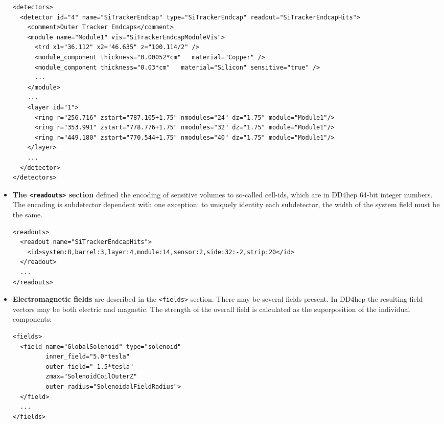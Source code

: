 \begin{itemize}
\begin{verbatim}
<detectors>
  <detector id="4" name="SiTrackerEndcap" type="SiTrackerEndcap" readout="SiTrackerEndcapHits">
    <comment>Outer Tracker Endcaps</comment>
    <module name="Module1" vis="SiTrackerEndcapModuleVis">
      <trd x1="36.112" x2="46.635" z="100.114/2" />
      <module_component thickness="0.00052*cm"   material="Copper" />
      <module_component thickness="0.03*cm"   material="Silicon" sensitive="true" />
      ...
    </module> 
    ...
    <layer id="1">
      <ring r="256.716" zstart="787.105+1.75" nmodules="24" dz="1.75" module="Module1"/>
      <ring r="353.991" zstart="778.776+1.75" nmodules="32" dz="1.75" module="Module1"/>
      <ring r="449.180" zstart="770.544+1.75" nmodules="40" dz="1.75" module="Module1"/>
    </layer>
    ...
  </detector>
</detectors>
\end{verbatim}

\item {\textbf{The \texttt{<readouts>} section}} defined the encoding of sensitive volumes to so-called cell-ids, which are in DD4hep 64-bit integer numbers. The encoding is subdetector dependent with one exception: to uniquely identity each subdetector, the width of the system field must be the same.
\begin{verbatim}
<readouts>
  <readout name="SiTrackerEndcapHits">
    <id>system:8,barrel:3,layer:4,module:14,sensor:2,side:32:-2,strip:20</id>
  </readout>
  ...
</readouts>
\end{verbatim}

\item {\textbf{Electromagnetic fields}} are described in the \texttt{<fields>} section. There may be several fields present. In DD4hep the resulting field vectors
may be both electric and magnetic. The strength of the overall field is calculated as the superposition of the individual components:
\begin{verbatim}
<fields>
  <field name="GlobalSolenoid" type="solenoid" 
         inner_field="5.0*tesla"
         outer_field="-1.5*tesla" 
         zmax="SolenoidCoilOuterZ"
         outer_radius="SolenoidalFieldRadius">
  </field>
  ...
</fields>
\end{verbatim}
\end{itemize}


